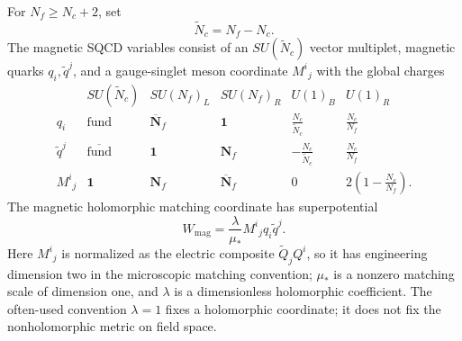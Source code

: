 For \(N_f\geq N_c+2\), set
\[
  \widetilde N_c=N_f-N_c .
\]
The magnetic SQCD variables consist of an \(SU(\widetilde N_c)\) vector
multiplet, magnetic quarks \(q_i,\widetilde q^j\), and a gauge-singlet meson
coordinate \(M^i{}_j\) with the global charges
\[
\begin{array}{c|c|c|c|c|c}
  & SU(\widetilde N_c) & SU(N_f)_L & SU(N_f)_R
  & U(1)_B & U(1)_R \\ \hline
  q_i & \mathrm{fund} & \overline{\mathbf N}_f & \mathbf 1
      & \frac{N_c}{\widetilde N_c} & \frac{N_c}{N_f} \\
  \widetilde q^j & \overline{\mathrm{fund}} & \mathbf 1 & \mathbf N_f
      & -\frac{N_c}{\widetilde N_c} & \frac{N_c}{N_f} \\
  M^i{}_j & \mathbf 1 & \mathbf N_f & \overline{\mathbf N}_f
      & 0 & 2\left(1-\frac{N_c}{N_f}\right).
\end{array}
\]
The magnetic holomorphic matching coordinate has superpotential
\begin{equation}
  W_{\mathrm{mag}}
  =
  \frac{\lambda}{\mu_*}M^i{}_j q_i\widetilde q^j .
  \label{eq:sqcd-magnetic-superpotential}
\end{equation}
Here \(M^i{}_j\) is normalized as the electric composite
\(\widetilde Q_jQ^i\), so it has engineering dimension two in the
microscopic matching convention; \(\mu_*\) is a nonzero matching scale of
dimension one, and \(\lambda\) is a dimensionless holomorphic coefficient.
The often-used convention \(\lambda=1\) fixes a holomorphic coordinate; it does
not fix the nonholomorphic metric on field space.

